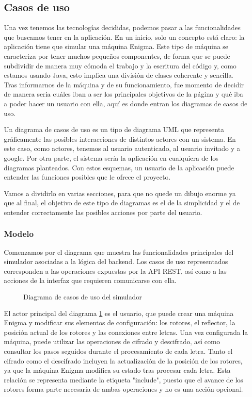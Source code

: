\subsection {Casos de uso}
Una vez tenemos las tecnologías decididas, podemos pasar a las funcionalidades que buscamos tener en la aplicación. En un inicio, solo un concepto está claro: la aplicación tiene que simular una máquina Enigma. Este tipo de máquina se caracteriza por tener muchos pequeños componentes, de forma que se puede subdividir de manera muy cómoda el trabajo y la escritura del código y, como estamos usando Java, esto implica una división de clases coherente y sencilla. Tras informarnos de la máquina y de su funcionamiento, fue momento de decidir de manera seria cuáles iban a ser los principales objetivos de la página y qué iba a poder hacer un usuario con ella, aquí es donde entran los diagramas de casos de uso. 

Un diagrama de casos de uso es un tipo de diagrama UML que representa gráficamente las posibles interacciones de distintos actores con un sistema. En este caso, como actores, tenemos al usuario autenticado, al usuario invitado y a google. Por otra parte, el sistema sería la aplicación en cualquiera de los diagramas planteados.
Con estos esquemas, un usuario de la aplicación puede entender las funciones posibles que le ofrece el proyecto.

Vamos a dividirlo en varias secciones, para que no quede un dibujo enorme ya que al final, el objetivo de este tipo de diagramas es el de la simplicidad y el de entender correctamente las posibles acciones por parte del usuario.

\subsubsection{Modelo}

Comenzamos por el diagrama que muestra las funcionalidades principales del simulador asociadas a la lógica del backend. Los casos de uso representados corresponden a las operaciones expuestas por la API REST, así como a las acciones de la interfaz que requieren comunicarse con ella.

\begin{figure}[htbp]
	\centerline{}
	\caption{Diagrama de casos de uso del simulador}
	\label{casos_uso_modelo}
\end{figure}

El actor principal del diagrama \ref{casos_uso_modelo} es el usuario, que puede crear una máquina Enigma y modificar sus elementos de configuración: los rotores, el reflector, la posición actual de los rotores y las conexiones entre letras. Una vez configurada la máquina, puede utilizar las operaciones de cifrado y descifrado, así como consultar los pasos seguidos durante el procesamiento de cada letra.
Tanto el cifrado como el descifrado incluyen la actualización de la posición de los rotores, ya que la máquina Enigma modifica su estado tras procesar cada letra. Esta relación se representa mediante la etiqueta "include", puesto que el avance de los rotores forma parte necesaria de ambas operaciones y no es una acción opcional.

